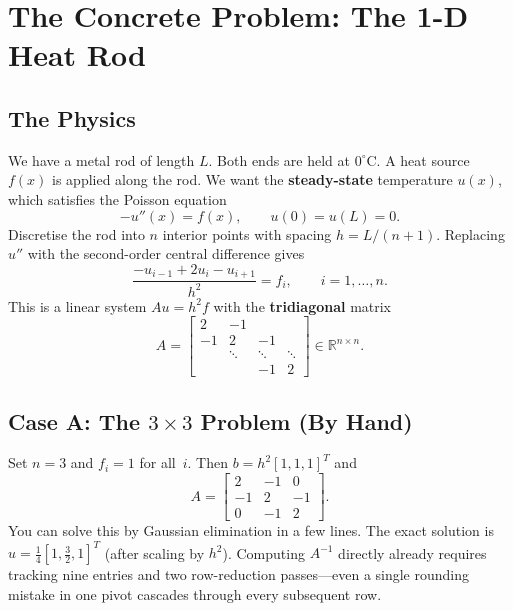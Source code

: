 \section{The Concrete Problem: The 1-D Heat Rod}

\subsection{The Physics}

We have a metal rod of length $L$.  Both ends are held at $0^\circ$C.  A heat
source $f(x)$ is applied along the rod.  We want the \textbf{steady-state}
temperature $u(x)$, which satisfies the Poisson equation
\[
    -u''(x) = f(x), \qquad u(0) = u(L) = 0.
\]
Discretise the rod into $n$ interior points with spacing $h = L/(n+1)$.
Replacing $u''$ with the second-order central difference gives
\[
    \frac{-u_{i-1} + 2u_i - u_{i+1}}{h^2} = f_i,
    \qquad i = 1,\dots,n.
\]
This is a linear system $Au = h^2 f$ with the \textbf{tridiagonal} matrix
\begin{equation}\label{eq:tridiag}
    A = \begin{bmatrix}
         2 & -1 &        &        \\
        -1 &  2 & -1     &        \\
           & \ddots & \ddots & \ddots \\
           &        & -1     &  2
    \end{bmatrix}
    \in \mathbb{R}^{n\times n}.
\end{equation}

\subsection{Case A: The $3\times 3$ Problem (By Hand)}

Set $n=3$ and $f_i=1$ for all~$i$.  Then $b = h^2[1,1,1]^T$ and
\[
    A = \begin{bmatrix} 2 & -1 & 0 \\ -1 & 2 & -1 \\ 0 & -1 & 2 \end{bmatrix}.
\]
You can solve this by Gaussian elimination in a few lines.
The exact solution is $u = \tfrac{1}{4}[1, \tfrac{3}{2}, 1]^T$ (after scaling
by $h^2$).  Computing $A^{-1}$ directly already requires tracking nine entries
and two row-reduction passes---even a single rounding mistake
in one pivot cascades through every subsequent row.

